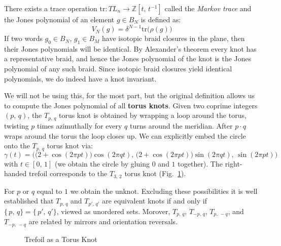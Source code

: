         There exists a trace operation
        $\textrm{tr}:TL_{n}\rightarrow\mathbb{Z}[t,\,t^{-1}]$ called the
        \textit{Markov trace} and the Jones polynomial of an element
        $g\in{B}_{N}$ is defined as:
        \begin{equation}
            V_{N}(g)=\delta^{N-1}\textrm{tr}\big(\rho(g)\big)
        \end{equation}
        If two words $g_{0}\in{B}_{N}$, $g_{1}\in{B}_{M}$ have isotopic
        braid closures in the plane, then their Jones polynomials will be
        identical. By Alexander's theorem every knot has a
        representative braid, and hence the Jones polynomial of the knot is
        the Jones polynomial of any such braid. Since isotopic braid closures
        yield identical polynomials, we do indeed have a knot invariant.
        \par\hfill\par
        We will not be using this, for the most part, but the original
        definition allows us to compute the Jones polynomial of all
        \textbf{torus knots}. Given two coprime integers $(p,\,q)$, the
        $T_{p,\,q}$ torus knot is obtained by wrapping a loop around the
        torus, twisting $p$ times azimuthally for every $q$ turns around the
        meridian. After $p\cdot{q}$ wraps around the torus the loop closes
        up. We can explicitly embed the circle onto the $T_{p,\,q}$ torus knot
        via:
        \begin{equation}
            \gamma(t)=\Big(
                \big(2+\cos(2\pi{pt})\big)\cos(2\pi{qt}),\,
                \big(2+\cos(2\pi{pt})\big)\sin(2\pi{qt}),\,
                \sin(2\pi{pt})
            \Big)
        \end{equation}
        with $t\in[0,\,1]$
        (we obtain the circle by gluing $0$ and $1$ together). The right-handed
        trefoil corresponds to the $T_{3,\,2}$ torus knot
        (Fig.~\ref{fig:trefoil_2_3_torus_knot_on_torus}).
        \par\hfill\par
        For $p$ or $q$ equal to $1$ we obtain the unknot. Excluding these
        possibilities it is well established that
        $T_{p,\,q}$ and $T_{p',\,q'}$ are equivalent knots if and only if
        $\{\,p,\,q\}=\{\,p',\,q'\}$, viewed as unordered sets. Morover,
        $T_{p,\,q}$, $T_{-p,\,q}$, $T_{p,\,-q}$, and $T_{-p,\,-q}$ are related
        by mirrors and orientation reversals.
        \begin{figure}
            \centering
            \caption{Trefoil as a Torus Knot}
            \label{fig:trefoil_2_3_torus_knot_on_torus}
        \end{figure}
